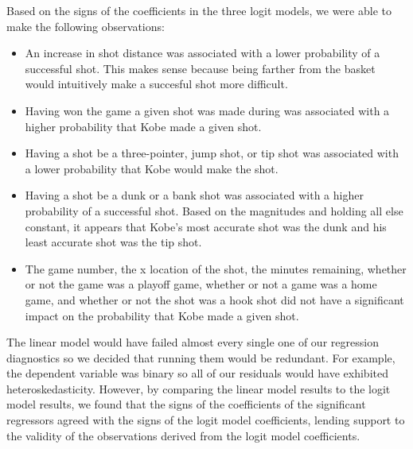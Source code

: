 \documentclass[paper=a4, fontsize=11pt]{scrartcl} %
\numberwithin{equation}{section} %
\numberwithin{figure}{section} %
\numberwithin{table}{section} %
\begin{document}
\hspace*{1cm}Based on the signs of the coefficients in the three logit models, we were able to make the following observations: 
\begin{itemize}
\item An increase in shot distance was associated with a lower probability of a successful shot. This makes sense because being farther from the basket would intuitively make a succesful shot more difficult. 
\item Having won the game a given shot was made during was associated with a higher probability that Kobe made a given shot.
\item Having a shot be a three-pointer, jump shot, or tip shot was associated with a lower probability that Kobe would make the shot. 
\item Having a shot be a dunk or a bank shot was associated with a higher probability of a successful shot. Based on the magnitudes and holding all else constant, it appears that Kobe's most accurate shot was the dunk and his least accurate shot was the tip shot. 
\item The game number, the x location of the shot, the minutes remaining, whether or not the game was a playoff game, whether or not a game was a home game, and whether or not the shot was a hook shot did not have a significant impact on the probability that Kobe made a given shot. 
\end{itemize}

\hspace*{1cm}The linear model would have failed almost every single one of our regression diagnostics so we decided that running them would be redundant. For example, the dependent variable was binary so all of our residuals would have exhibited heteroskedasticity. However, by comparing the linear model results to the logit model results, we found that the signs of the coefficients of the significant regressors agreed with the signs of the logit model coefficients, lending support to the validity of the observations derived from the logit model coefficients. 
\end{document}
